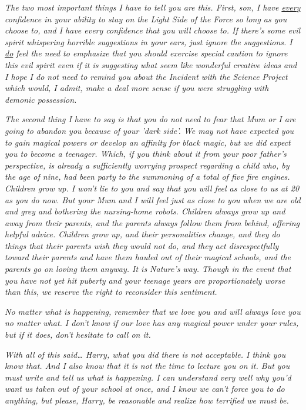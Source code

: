 \emph{The two most important things I have to tell you are this. First, son, I 
have \underline{every} confidence in your ability to stay on the Light Side of 
the Force so long as you choose to, and I have every confidence that you will 
choose to. If there's some evil spirit whispering horrible suggestions in your 
ears, just ignore the suggestions. I \underline{do} feel the need to emphasize 
that you should exercise special caution to ignore this evil spirit even if it 
is suggesting what seem like wonderful creative ideas and I hope I do not need 
to remind you about the Incident with the Science Project which would, I admit, 
make a deal more sense if you were struggling with demonic possession.}

\emph{The second thing I have to say is that you do not need to fear that Mum 
or I are going to abandon you because of your 'dark side'. We may not have 
expected you to gain magical powers or develop an affinity for black magic, but 
we did expect you to become a teenager. Which, if you think about it from your 
poor father's perspective, is already a sufficiently worrying prospect 
regarding a child who, by the age of nine, had been party to the summoning of a 
total of five fire engines. Children grow up. I won't lie to you and say that 
you will feel as close to us at 20 as you do now. But your Mum and I will feel 
just as close to you when we are old and grey and bothering the nursing-home 
robots. Children always grow up and away from their parents, and the parents 
always follow them from behind, offering helpful advice. Children grow up, and 
their personalities change, and they do things that their parents wish they 
would not do, and they act disrespectfully toward their parents and have them 
hauled out of their magical schools, and the parents go on loving them anyway. 
It is Nature's way. Though in the event that you have not yet hit puberty and 
your teenage years are proportionately worse than this, we reserve the right to 
reconsider this sentiment.}

\emph{No matter what is happening, remember that we love you and will always 
love you no matter what. I don't know if our love has any magical power under 
your rules, but if it does, don't hesitate to call on it.}

\emph{With all of this said{\ldots} Harry, what you did there is not 
acceptable. I think you know that. And I also know that it is not the time to 
lecture you on it. But you must write and tell us what is happening. I can 
understand very well why you'd want us taken out of your school at once, and I 
know we can't force you to do anything, but please, Harry, be reasonable and 
realize how terrified we must be.}

